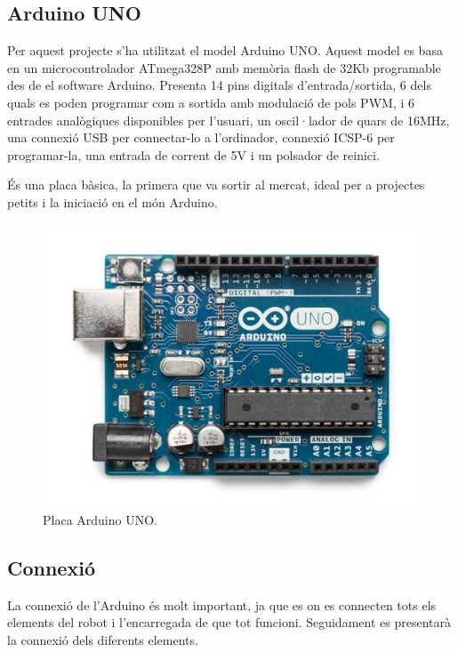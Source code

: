 \subsection{Arduino UNO}

Per aquest projecte s’ha utilitzat el model Arduino UNO. Aquest model  es basa en un microcontrolador ATmega328P amb memòria flash de 32Kb programable des de el software Arduino. Presenta 14 pins digitals d’entrada/sortida, 6 dels quals es poden programar com a sortida amb modulació de pols PWM, i 6 entrades analògiques disponibles per l’usuari, un oscil·lador de quars de 16MHz, una connexió USB per connectar-lo a l’ordinador, connexió ICSP-6 per programar-la, una entrada de corrent de 5V i un polsador de reinici. 

És una placa bàsica, la primera que va sortir al mercat, ideal per a projectes petits i la iniciació en el món Arduino.

\begin{figure}[H]
	\centering
	\includegraphics[scale=0.5]{arduino-uno.png}
	\caption{Placa Arduino UNO.}
	\label{fig:arduinouno}
\end{figure}

\subsection{Connexió}\label{sec:connexio}

La connexió de l’Arduino és molt important, ja que es on es connecten tots els elements del robot i l’encarregada de que tot funcioni. Seguidament es presentarà la connexió dels diferents elements.

